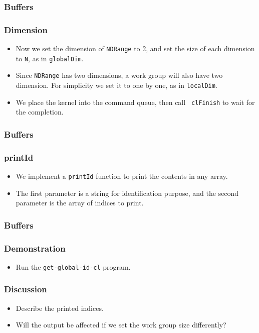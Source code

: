 \documentclass{beamer}
\begin{document}
\begin{frame}
  \frametitle{Buffers}
\end{frame}

\begin{frame}
  \frametitle{Dimension}
  \begin{itemize}
    \item Now we set the dimension of {\tt NDRange} to 2, and set the
      size of each dimension to {\tt N}, as in {\tt globalDim}.
    \item Since {\tt NDRange} has two dimensions, a work group will
      also have two dimension.  For simplicity we set it to one by
      one, as in {\tt localDim}. 
      \item We place the kernel into the command queue, then call {\tt
        clFinish} to wait for the completion.
  \end{itemize}
\end{frame}

\begin{frame}
  \frametitle{Buffers}
\end{frame}

\begin{frame}
  \frametitle{printId}
  \begin{itemize}
    \item We implement a {\tt printId} function to print the contents
      in any array.
    \item The first parameter is a string for identification purpose,
      and the second parameter is the array of indices to print.
  \end{itemize}
\end{frame}

\begin{frame}
  \frametitle{Buffers}
\end{frame}

\begin{frame}
  \frametitle{Demonstration}
  \begin{itemize}
    \item Run the {\tt get-global-id-cl} program.
  \end{itemize}
\end{frame}

\begin{frame}
  \frametitle{Discussion}
  \begin{itemize}
  \item Describe the printed indices.
  \item Will the output be affected if we set the work group size
    differently?
  \end{itemize}
\end{frame}
\end{document}
